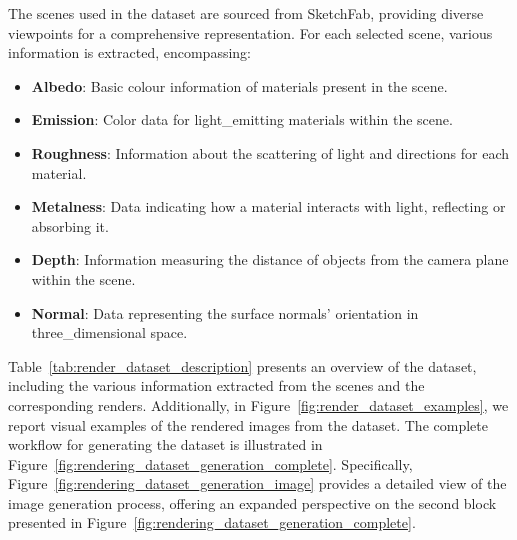The scenes used in the dataset are sourced from SketchFab, providing diverse viewpoints for a comprehensive representation. For each selected scene, various information is extracted, encompassing:

\begin{itemize}
    \item \textbf{Albedo}: Basic colour information of materials present in the scene.
    \item \textbf{Emission}: Color data for light_emitting materials within the scene.
    \item \textbf{Roughness}: Information about the scattering of light and directions for each material.
    \item \textbf{Metalness}: Data indicating how a material interacts with light, reflecting or absorbing it.
    \item \textbf{Depth}: Information measuring the distance of objects from the camera plane within the scene.
    \item \textbf{Normal}: Data representing the surface normals' orientation in three_dimensional space.
\end{itemize}

Table~\ref{tab:render_dataset_description} presents an overview of the dataset, including the various information extracted from the scenes and the corresponding renders. Additionally, in Figure~\ref{fig:render_dataset_examples}, we report visual examples of the rendered images from the dataset. The complete workflow for generating the dataset is illustrated in Figure~\ref{fig:rendering_dataset_generation_complete}. Specifically, Figure~\ref{fig:rendering_dataset_generation_image} provides a detailed view of the image generation process, offering an expanded perspective on the second block presented in Figure~\ref{fig:rendering_dataset_generation_complete}.


